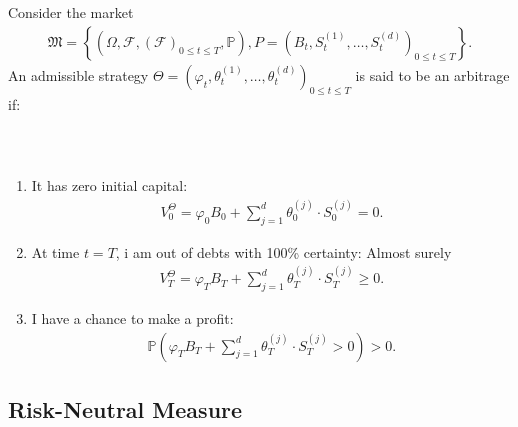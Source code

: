 \documentclass{beamer}
\numberwithin{equation}{section}
\begin{document}
\begin{frame}\frametitle{{\normalsize \secname} \\ {\large \subsecname}}
    \begin{definition}[Arbitrage]
        Consider the market
        \begin{align}
            \mathfrak{M} =
            \left\{
                \left(
                    \Omega, 
                    \mathscr{F}, 
                    \left(
                        \mathscr{F}
                    \right)_{0 \leq t \leq T},
                    \mathbb{P}
                \right),
                P =
                \left(
                    B_t,
                    S_t^{(1)},
                    \ldots,
                    S_t^{(d)}
                \right)_{0 \leq t \leq T}
            \right\}.
        \end{align}
        An admissible strategy $\Theta = \left(\varphi_t, \theta_t^{(1)}, \ldots, \theta_t^{(d)}\right)_{0 \leq t \leq T}$ is said to be an arbitrage if:
    \end{definition}
\end{frame}

\begin{frame}\frametitle{{\normalsize \secname} \\ {\large \subsecname}}
    \begin{enumerate}
        \item It has zero initial capital:
        \begin{align}
            V_0^\Theta = \varphi_0B_0 + \sum_{j = 1}^d\theta_0^{(j)} \cdot S_0^{(j)} = 0.
        \end{align}
        \item At time $t = T$, i am out of debts with 100\% certainty: Almost surely
        \begin{align}
            V_T^\Theta = \varphi_T B_T + \sum_{j = 1}^d\theta_T^{(j)} \cdot S_T^{(j)} \geq 0.
        \end{align}
        \item I have a chance to make a profit:
        \begin{align}
            \mathbb{P}
            \left(
                \varphi_TB_T + \sum_{j = 1}^d \theta_T^{(j)} \cdot S_T^{(j)} > 0
            \right) > 0.
        \end{align}
    \end{enumerate}
\end{frame}

\subsection{Risk-Neutral Measure}
\end{document}
